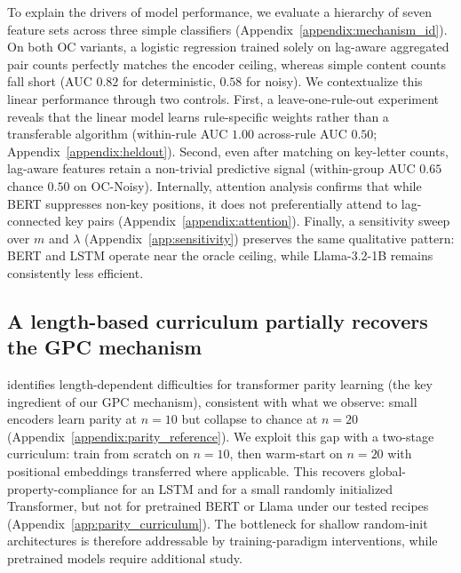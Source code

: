 \documentclass{article} %
\theoremstyle{plain}
\theoremstyle{definition}
\theoremstyle{remark}
\begin{document}
To explain the drivers of model performance, we evaluate a hierarchy of seven feature sets across three simple classifiers (Appendix~\ref{appendix:mechanism_id}). On both OC variants, a logistic regression trained solely on lag-aware aggregated pair counts perfectly matches the encoder ceiling, whereas simple content counts fall short (AUC $0.82$ for deterministic, $0.58$ for noisy). We contextualize this linear performance through two controls. First, a leave-one-rule-out experiment reveals that the linear model learns rule-specific weights rather than a transferable algorithm (within-rule AUC $1.00$ \vs across-rule AUC $0.50$; Appendix~\ref{appendix:heldout}). Second, even after matching on key-letter counts, lag-aware features retain a non-trivial predictive signal (within-group AUC $0.65$ \vs chance $0.50$ on OC-Noisy). Internally, attention analysis confirms that while BERT suppresses non-key positions, it does not preferentially attend to lag-connected key pairs (Appendix~\ref{appendix:attention}). Finally, a sensitivity sweep over $m$ and $\lambda$ (Appendix~\ref{app:sensitivity}) preserves the same qualitative pattern: BERT and LSTM operate near the oracle ceiling, while Llama-3.2-1B remains consistently less efficient.

\subsection{A length-based curriculum partially recovers the GPC mechanism}
\label{sec:curriculum}
\citet{hahn-2020-theoretical} identifies length-dependent difficulties for transformer parity learning (the key ingredient of our GPC mechanism), consistent with what we observe: small encoders learn parity at $n=10$ but collapse to chance at $n=20$ (Appendix~\ref{appendix:parity_reference}). We exploit this gap with a two-stage curriculum: train from scratch on $n=10$, then warm-start on $n=20$ with positional embeddings transferred where applicable. This recovers global-property-compliance for an LSTM and for a small randomly initialized Transformer, but not for pretrained BERT or Llama under our tested recipes (Appendix~\ref{app:parity_curriculum}). The bottleneck for shallow random-init architectures is therefore addressable by training-paradigm interventions, while pretrained models require additional study.
\end{document}
